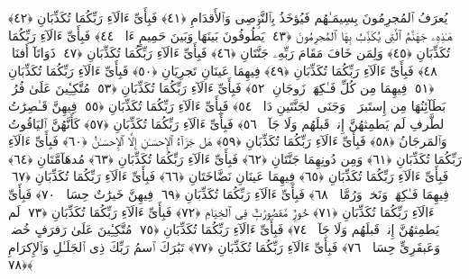  يُعرَفُ ٱلمُجرِمُونَ بِسِيمَـٰهُم فَيُؤخَذُ بِٱلنَّوَٟصِى وَٱلأَقدَامِ ﴿٤١﴾
 فَبِأَىِّ ءَالَآءِ رَبِّكُمَا تُكَذِّبَانِ ﴿٤٢﴾
 هَـٰذِهِۦ جَهَنَّمُ ٱلَّتِى يُكَذِّبُ بِهَا ٱلمُجرِمُونَ ﴿٤٣﴾
 يَطُوفُونَ بَينَهَا وَبَينَ حَمِيمٍ ءَانٍۢ ﴿٤٤﴾
 فَبِأَىِّ ءَالَآءِ رَبِّكُمَا تُكَذِّبَانِ ﴿٤٥﴾
 وَلِمَن خَافَ مَقَامَ رَبِّهِۦ جَنَّتَانِ ﴿٤٦﴾
 فَبِأَىِّ ءَالَآءِ رَبِّكُمَا تُكَذِّبَانِ ﴿٤٧﴾
 ذَوَاتَآ أَفنَانٍۢ ﴿٤٨﴾
 فَبِأَىِّ ءَالَآءِ رَبِّكُمَا تُكَذِّبَانِ ﴿٤٩﴾
 فِيهِمَا عَينَانِ تَجرِيَانِ ﴿٥٠﴾
 فَبِأَىِّ ءَالَآءِ رَبِّكُمَا تُكَذِّبَانِ ﴿٥١﴾
 فِيهِمَا مِن كُلِّ فَـٰكِهَةٍۢ زَوجَانِ ﴿٥٢﴾
 فَبِأَىِّ ءَالَآءِ رَبِّكُمَا تُكَذِّبَانِ ﴿٥٣﴾
 مُتَّكِـِٔينَ عَلَىٰ فُرُشٍۭ بَطَآئِنُهَا مِن إِستَبرَقٍۢ ۚ وَجَنَى ٱلجَنَّتَينِ دَانٍۢ ﴿٥٤﴾
 فَبِأَىِّ ءَالَآءِ رَبِّكُمَا تُكَذِّبَانِ ﴿٥٥﴾
 فِيهِنَّ قَـٰصِرَٰتُ ٱلطَّرفِ لَم يَطمِثهُنَّ إِنسٌۭ قَبلَهُم وَلَا جَآنٌّۭ ﴿٥٦﴾
 فَبِأَىِّ ءَالَآءِ رَبِّكُمَا تُكَذِّبَانِ ﴿٥٧﴾
 كَأَنَّهُنَّ ٱليَاقُوتُ وَٱلمَرجَانُ ﴿٥٨﴾
 فَبِأَىِّ ءَالَآءِ رَبِّكُمَا تُكَذِّبَانِ ﴿٥٩﴾
 هَل جَزَآءُ ٱلإِحسَـٰنِ إِلَّا ٱلإِحسَـٰنُ ﴿٦٠﴾
 فَبِأَىِّ ءَالَآءِ رَبِّكُمَا تُكَذِّبَانِ ﴿٦١﴾
 وَمِن دُونِهِمَا جَنَّتَانِ ﴿٦٢﴾
 فَبِأَىِّ ءَالَآءِ رَبِّكُمَا تُكَذِّبَانِ ﴿٦٣﴾
 مُدهَآمَّتَانِ ﴿٦٤﴾
 فَبِأَىِّ ءَالَآءِ رَبِّكُمَا تُكَذِّبَانِ ﴿٦٥﴾
 فِيهِمَا عَينَانِ نَضَّاخَتَانِ ﴿٦٦﴾
 فَبِأَىِّ ءَالَآءِ رَبِّكُمَا تُكَذِّبَانِ ﴿٦٧﴾
 فِيهِمَا فَـٰكِهَةٌۭ وَنَخلٌۭ وَرُمَّانٌۭ ﴿٦٨﴾
 فَبِأَىِّ ءَالَآءِ رَبِّكُمَا تُكَذِّبَانِ ﴿٦٩﴾
 فِيهِنَّ خَيرَٰتٌ حِسَانٌۭ ﴿٧٠﴾
 فَبِأَىِّ ءَالَآءِ رَبِّكُمَا تُكَذِّبَانِ ﴿٧١﴾
 حُورٌۭ مَّقصُورَٰتٌۭ فِى ٱلخِيَامِ ﴿٧٢﴾
 فَبِأَىِّ ءَالَآءِ رَبِّكُمَا تُكَذِّبَانِ ﴿٧٣﴾
 لَم يَطمِثهُنَّ إِنسٌۭ قَبلَهُم وَلَا جَآنٌّۭ ﴿٧٤﴾
 فَبِأَىِّ ءَالَآءِ رَبِّكُمَا تُكَذِّبَانِ ﴿٧٥﴾
 مُتَّكِـِٔينَ عَلَىٰ رَفرَفٍ خُضرٍۢ وَعَبقَرِىٍّ حِسَانٍۢ ﴿٧٦﴾
 فَبِأَىِّ ءَالَآءِ رَبِّكُمَا تُكَذِّبَانِ ﴿٧٧﴾
 تَبَٰرَكَ ٱسمُ رَبِّكَ ذِى ٱلجَلَـٰلِ وَٱلإِكرَامِ ﴿٧٨﴾
 
